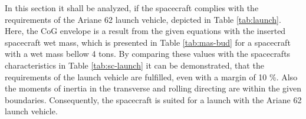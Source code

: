 \documentclass[conference]{IEEEtran}
\begin{document}
In this section it shall be analyzed, if the spacecraft complies with the requirements of the Ariane 62 launch vehicle, depicted in Table \ref{tab:launch}. Here, the CoG envelope is a result from the given equations with the inserted spacecraft wet mass, which is presented in Table \ref{tab:mas-bud} for a spacecraft with a wet mass bellow 4 tons. By comparing these values with the spacecrafts characteristics in Table \ref{tab:sc-launch} it can be demonstrated, that the requirements of the launch vehicle are fulfilled, even with a margin of 10 \%. Also the moments of inertia in the transverse and rolling directing are within the given boundaries. Consequently, the spacecraft is suited for a launch with the Ariane 62 launch vehicle.

\begin{table}[H]
\caption{Ariane 62 launch vehicle requirements \cite{Arianspace.2016}}
\label{tab:launch}
\end{table}
\end{document}
